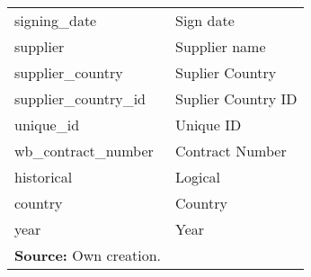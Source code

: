 \begin{table}[H]
\begin{center}
{\begin{tabular}{ll}
  signing\_date & Sign date \\ 
  supplier & Supplier name \\ 
  supplier\_country & Suplier Country \\ 
  supplier\_country\_id & Suplier Country ID \\ 
  unique\_id & Unique ID \\ 
  wb\_contract\_number & Contract Number \\ 
  historical & Logical \\ 
  country & Country \\ 
  year & Year \\ 
   \hline
   \footnotesize{\textbf{Source:} Own creation.} &

\end{tabular}}
\end{center}

\end{table}

